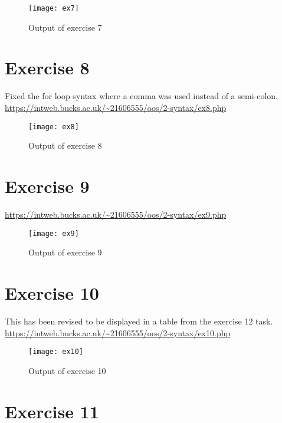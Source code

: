 \begin{figure}[H]
  \caption{Output of exercise 7}
  \centering
  \texttt{[image: ex7]}
\end{figure}

\clearpage
\section{Exercise 8}

Fixed the for loop syntax where a comma was used instead of a semi-colon.\\

\url{https://intweb.bucks.ac.uk/~21606555/oos/2-syntax/ex8.php}
\captionsetup{type=figure}


\begin{figure}[H]
  \caption{Output of exercise 8}
  \centering
  \texttt{[image: ex8]}
\end{figure}

\clearpage
\section{Exercise 9}

\url{https://intweb.bucks.ac.uk/~21606555/oos/2-syntax/ex9.php}
\captionsetup{type=figure}


\begin{figure}[H]
  \caption{Output of exercise 9}
  \centering
  \texttt{[image: ex9]}
\end{figure}

\clearpage
\section{Exercise 10}

This has been revised to be displayed in a table from the exercise 12 task.\\

\url{https://intweb.bucks.ac.uk/~21606555/oos/2-syntax/ex10.php}
\captionsetup{type=figure}


\begin{figure}[H]
  \caption{Output of exercise 10}
  \centering
  \texttt{[image: ex10]}
\end{figure}

\section{Exercise 11}

